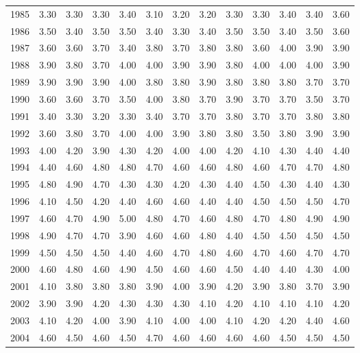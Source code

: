 \begin{longtable}{rrrrrrrrrrrrr}
  1985 & 3.30 & 3.30 & 3.30 & 3.40 & 3.10 & 3.20 & 3.20 & 3.30 & 3.30 & 3.40 & 3.40 & 3.60 \\ 
  1986 & 3.50 & 3.40 & 3.50 & 3.50 & 3.40 & 3.30 & 3.40 & 3.50 & 3.50 & 3.40 & 3.50 & 3.60 \\ 
  1987 & 3.60 & 3.60 & 3.70 & 3.40 & 3.80 & 3.70 & 3.80 & 3.80 & 3.60 & 4.00 & 3.90 & 3.90 \\ 
  1988 & 3.90 & 3.80 & 3.70 & 4.00 & 4.00 & 3.90 & 3.90 & 3.80 & 4.00 & 4.00 & 4.00 & 3.90 \\ 
  1989 & 3.90 & 3.90 & 3.90 & 4.00 & 3.80 & 3.80 & 3.90 & 3.80 & 3.80 & 3.80 & 3.70 & 3.70 \\ 
  1990 & 3.60 & 3.60 & 3.70 & 3.50 & 4.00 & 3.80 & 3.70 & 3.90 & 3.70 & 3.70 & 3.50 & 3.70 \\ 
  1991 & 3.40 & 3.30 & 3.20 & 3.30 & 3.40 & 3.70 & 3.70 & 3.80 & 3.70 & 3.70 & 3.80 & 3.80 \\ 
  1992 & 3.60 & 3.80 & 3.70 & 4.00 & 4.00 & 3.90 & 3.80 & 3.80 & 3.50 & 3.80 & 3.90 & 3.90 \\ 
  1993 & 4.00 & 4.20 & 3.90 & 4.30 & 4.20 & 4.00 & 4.00 & 4.20 & 4.10 & 4.30 & 4.40 & 4.40 \\ 
  1994 & 4.40 & 4.60 & 4.80 & 4.80 & 4.70 & 4.60 & 4.60 & 4.80 & 4.60 & 4.70 & 4.70 & 4.80 \\ 
  1995 & 4.80 & 4.90 & 4.70 & 4.30 & 4.30 & 4.20 & 4.30 & 4.40 & 4.50 & 4.30 & 4.40 & 4.30 \\ 
  1996 & 4.10 & 4.50 & 4.20 & 4.40 & 4.60 & 4.60 & 4.40 & 4.40 & 4.50 & 4.50 & 4.50 & 4.70 \\ 
  1997 & 4.60 & 4.70 & 4.90 & 5.00 & 4.80 & 4.70 & 4.60 & 4.80 & 4.70 & 4.80 & 4.90 & 4.90 \\ 
  1998 & 4.90 & 4.70 & 4.70 & 3.90 & 4.60 & 4.60 & 4.80 & 4.40 & 4.50 & 4.50 & 4.50 & 4.50 \\ 
  1999 & 4.50 & 4.50 & 4.50 & 4.40 & 4.60 & 4.70 & 4.80 & 4.60 & 4.70 & 4.60 & 4.70 & 4.70 \\ 
  2000 & 4.60 & 4.80 & 4.60 & 4.90 & 4.50 & 4.60 & 4.60 & 4.50 & 4.40 & 4.40 & 4.30 & 4.00 \\ 
  2001 & 4.10 & 3.80 & 3.80 & 3.80 & 3.90 & 4.00 & 3.90 & 4.20 & 3.90 & 3.80 & 3.70 & 3.90 \\ 
  2002 & 3.90 & 3.90 & 4.20 & 4.30 & 4.30 & 4.30 & 4.10 & 4.20 & 4.10 & 4.10 & 4.10 & 4.20 \\ 
  2003 & 4.10 & 4.20 & 4.00 & 3.90 & 4.10 & 4.00 & 4.00 & 4.10 & 4.20 & 4.20 & 4.40 & 4.60 \\ 
  2004 & 4.60 & 4.50 & 4.60 & 4.50 & 4.70 & 4.60 & 4.60 & 4.60 & 4.60 & 4.50 & 4.50 & 4.50 \\ 

\end{longtable}
